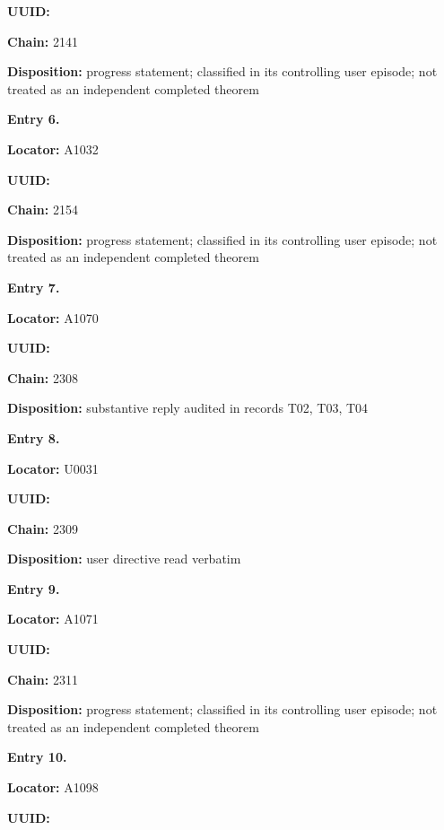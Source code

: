 \textbf{UUID:} \protect{}

\textbf{Chain:} 2141

\textbf{Disposition:} progress statement; classified in its controlling
user episode; not treated as an independent completed theorem


\textbf{Entry 6.}

\textbf{Locator:} A1032

\textbf{UUID:} \protect{}

\textbf{Chain:} 2154

\textbf{Disposition:} progress statement; classified in its controlling
user episode; not treated as an independent completed theorem


\textbf{Entry 7.}

\textbf{Locator:} A1070

\textbf{UUID:} \protect{}

\textbf{Chain:} 2308

\textbf{Disposition:} substantive reply audited in records T02, T03, T04


\textbf{Entry 8.}

\textbf{Locator:} U0031

\textbf{UUID:} \protect{}

\textbf{Chain:} 2309

\textbf{Disposition:} user directive read verbatim


\textbf{Entry 9.}

\textbf{Locator:} A1071

\textbf{UUID:} \protect{}

\textbf{Chain:} 2311

\textbf{Disposition:} progress statement; classified in its controlling
user episode; not treated as an independent completed theorem


\textbf{Entry 10.}

\textbf{Locator:} A1098

\textbf{UUID:} \protect{}

